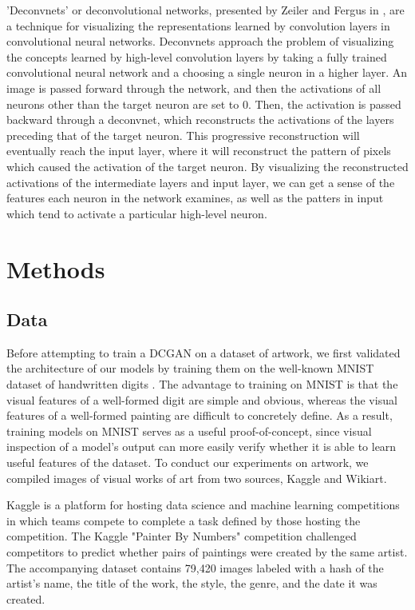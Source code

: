 \documentclass[10pt,twocolumn,letterpaper]{article}
\begin{document}
'Deconvnets' or deconvolutional networks, presented by Zeiler and Fergus in \cite{zeiler2014visualizing}, are a technique for visualizing the representations learned by convolution layers in convolutional neural networks. Deconvnets approach the problem of visualizing the concepts learned by high-level convolution layers by taking a fully trained convolutional neural network and a choosing a single neuron in a higher layer. An image is passed forward through the network, and then the activations of all neurons other than the target neuron are set to 0. Then, the activation is passed backward through a deconvnet, which reconstructs the activations of the layers preceding that of the target neuron. This progressive reconstruction will eventually reach the input layer, where it will reconstruct the pattern of pixels which caused the activation of the target neuron. By visualizing the reconstructed activations of the intermediate layers and input layer, we can get a sense of the features each neuron in the network examines, as well as the patters in input which tend to activate a particular high-level neuron.

\section{Methods}
\subsection{Data}
Before attempting to train a DCGAN on a dataset of artwork, we first validated the architecture of our models by training them on the well-known MNIST dataset of handwritten digits \cite{lecun2010mnist}. The advantage to training on MNIST is that the visual features of a well-formed digit are simple and obvious, whereas the visual features of a well-formed painting are difficult to concretely define. As a result, training models on MNIST serves as a useful proof-of-concept, since visual inspection of a model's output can more easily verify whether it is able to learn useful features of the dataset. To conduct our experiments on artwork, we compiled images of visual works of art from two sources, Kaggle and Wikiart.

Kaggle is a platform for hosting data science and machine learning competitions in which teams compete to complete a task defined by those hosting the competition. The Kaggle "Painter By Numbers" competition challenged competitors to predict whether pairs of paintings were created by the same artist. The accompanying dataset contains 79,420 images labeled with a hash of the artist's name, the title of the work, the style, the genre, and the date it was created.
\end{document}
